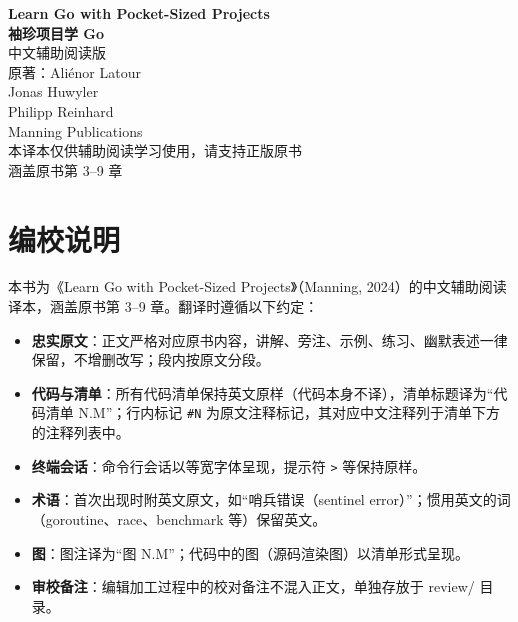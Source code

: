 \documentclass[11pt,openany]{book}
\begin{document}
\frontmatter
\begin{titlepage}
\centering
\vspace*{3cm}
{\Huge\bfseries Learn Go with Pocket-Sized Projects\\[0.8cm]
袖珍项目学 Go}\\[1.2cm]
{\Large 中文辅助阅读版}\\[2cm]
{\large 原著：Aliénor Latour\\
Jonas Huwyler\\
Philipp Reinhard}\\[1cm]
{\large Manning Publications}\\[3cm]
{\normalsize 本译本仅供辅助阅读学习使用，请支持正版原书}\\[0.5cm]
{\normalsize 涵盖原书第 3--9 章}\\[2cm]
\vfill
\end{titlepage}

\chapter*{编校说明}

本书为《Learn Go with Pocket-Sized Projects》（Manning, 2024）的中文辅助阅读译本，涵盖原书第 3--9 章。翻译时遵循以下约定：

\begin{itemize}
  \item \textbf{忠实原文}：正文严格对应原书内容，讲解、旁注、示例、练习、幽默表述一律保留，不增删改写；段内按原文分段。
  \item \textbf{代码与清单}：所有代码清单保持英文原样（代码本身不译），清单标题译为``代码清单 N.M''；行内标记 \texttt{\#N} 为原文注释标记，其对应中文注释列于清单下方的注释列表中。
  \item \textbf{终端会话}：命令行会话以等宽字体呈现，提示符 \texttt{>} 等保持原样。
  \item \textbf{术语}：首次出现时附英文原文，如``哨兵错误（sentinel error）''；惯用英文的词（goroutine、race、benchmark 等）保留英文。
  \item \textbf{图}：图注译为``图 N.M''；代码中的图（源码渲染图）以清单形式呈现。
  \item \textbf{审校备注}：编辑加工过程中的校对备注不混入正文，单独存放于 review/ 目录。
\end{itemize}

\tableofcontents
\mainmatter

\setcounter{page}{1}

\setcounter{chapter}{2}









\end{document}
